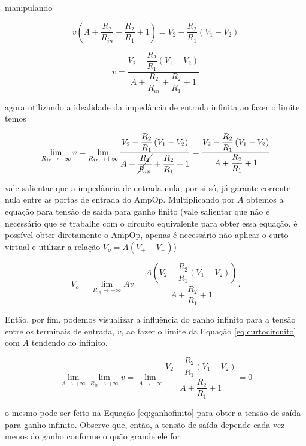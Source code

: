 \documentclass{article}
\numberwithin{equation}{section}
\let\dfr\dfrac
\begin{document}
\noindent manipulando

\begin{equation*}
    v\left(A+\dfr{R_2}{R_{in}}+\dfr{R_2}{R_{1}}+1\right) = V_2 -\dfr{R_2}{R_1}\left(V_1-V_2\right) 
\end{equation*}

\begin{equation*}
    v = \dfr{V_2-\dfr{R_2}{R_1}\left(V_1-V_2\right)}{A+\dfr{R_2}{R_{in}}+\dfr{R_2}{R_1}+1}
\end{equation*}

\noindent agora utilizando a idealidade da impedância de entrada infinita ao fazer o limite temos

\begin{equation}
    \label{eq:curtocircuito}
    \lim_{R_{in}\to+\infty}v = \lim_{R_{in}\to+\infty} \dfr{V_2-\dfr{R_2}{R_1}\left(V_1-V_2\right)}{A+\cancel{\dfr{R_2}{R_{in}}}+\dfr{R_2}{R_1}+1} = \dfr{V_2-\dfr{R_2}{R_1}\left(V_1-V_2\right)}{A+\dfr{R_2}{R_1}+1}
\end{equation}

\noindent vale salientar que a impedância de entrada nula, por si só, já garante corrente nula entre as portas de entrada do AmpOp. Multiplicando por $A$ obtemos a equação para tensão de saída para ganho finito (vale salientar que não é necessário que se trabalhe com o circuito equivalente para obter essa equação, é possível obter diretamente o AmpOp, apenas é necessário não aplicar o curto virtual e utilizar a relação $V_o = A(V_+-V_-)$)

\begin{equation}
    \label{eq:ganhofinito}
    V_o = \lim_{R_{in}\to+\infty}Av = \dfr{A\left(V_2-\dfr{R_2}{R_1}\left(V_1-V_2\right)\right)}{A+\dfr{R_2}{R_1}+1}.
\end{equation}

\noindent Então, por fim, podemos visualizar a influência do ganho infinito para a tensão entre os terminais de entrada, $v$, ao fazer o limite da Equação \eqref{eq:curtocircuito} com $A$ tendendo ao infinito.

\begin{equation*}
    \lim_{A\to+\infty}\lim_{R_{in}\to+\infty}v = \lim_{A\to+\infty} \dfr{V_2-\dfr{R_2}{R_1}\left(V_1-V_2\right)}{A+\dfr{R_2}{R_1}+1} = 0
\end{equation*}

\noindent o mesmo pode ser feito na Equação \eqref{eq:ganhofinito} para obter a tensão de saída para ganho infinito. Observe que, então, a tensão de saída depende cada vez menos do ganho conforme o quão grande ele for
\end{document}
